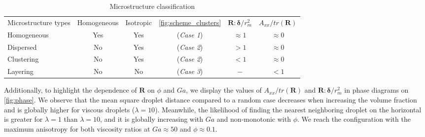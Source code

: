 \begin{table}[h!]
    \caption{Microstructure classification}
    \label{tab:microstructure}
    \centering
    \begin{tabular}{|lccccc|} \hline
        Microstructure types & Homogeneous & Isotropic & \ref{fig:scheme_clusters} & $\textbf{R}:\bm\delta/r_m^2$ & $A_{xx}/tr(\textbf{R})$ \\
        Homogeneous & Yes & Yes &(\textit{Case 1}) & $ \approx 1$ & $\approx 0$ \\
        Dispersed &  No & Yes  &(\textit{Case 2}) & $ > 1$ & $\approx 0$ \\
        Clustering &  No & Yes  &(\textit{Case 2}) & $ < 1$ & $\approx 0$ \\
        Layering &    No & No  &(\textit{Case 3}) & $ - $ & $< 1$\\ \hline
    \end{tabular}
\end{table}
Additionally, to highlight the dependence of $\textbf{R}$ on $\phi$ and $Ga$, we display the values of $A_{xx}/tr(\textbf{R})$ and $\textbf{R}:\bm\delta/r_m^2$ in phase diagrams on \ref{fig:phase}.
We observe that the mean square droplet distance compared to a random case decreases when increasing the volume fraction and is globally higher for viscous droplets ($\lambda = 10$).
Meanwhile, the likelihood of finding the nearest neighboring droplet on the horizontal is greater for $\lambda=1$ than $\lambda = 10$, and it is globally increasing with  $Ga$ and non-monotonic with $\phi$. 
We reach the configuration with the maximum anisotropy for both viscosity ratios at $Ga \approx 50$ and $\phi \approx 0.1$. 

